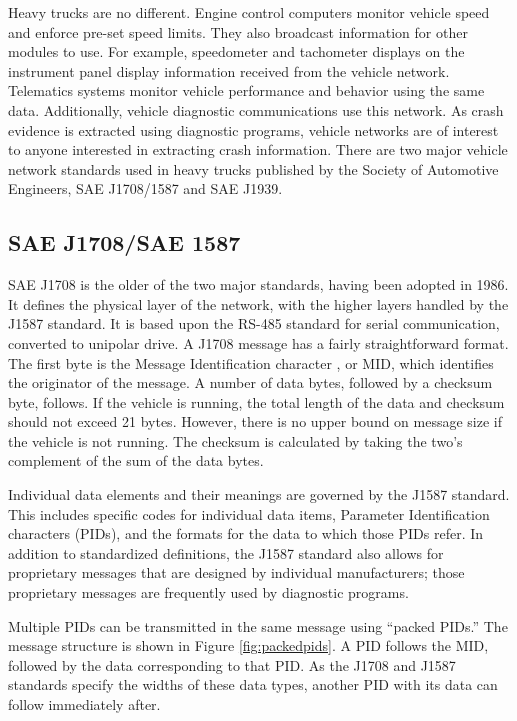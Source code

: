 Heavy trucks are no different. Engine control computers monitor vehicle speed and enforce pre-set speed limits. They also broadcast information
for other modules to use. For example, speedometer and tachometer displays on the instrument panel display information received from the vehicle
network. Telematics systems monitor vehicle performance and behavior using the same data. Additionally, vehicle diagnostic communications use
this network. As crash evidence is extracted using diagnostic programs, vehicle networks are of interest to anyone interested in extracting
crash information. There are two major vehicle network standards used in heavy trucks published by the Society of Automotive Engineers,
 SAE J1708/1587\cite{J1708}\cite{J1587} and SAE J1939\cite{J1939-71}.

\subsection{SAE J1708/SAE 1587}

SAE J1708 is the older of the two major standards, having been adopted in 1986. It defines the physical layer of the network,
with the higher layers handled by the J1587 standard. It is based upon the RS-485 standard for serial communication, converted to 
unipolar drive. A J1708 message has a fairly straightforward format. The first byte is the Message Identification character
, or MID, which identifies the originator of the message. A number of data bytes, followed by a checksum byte, follows. If the vehicle is running, 
the total length of the data and checksum should not exceed 21 bytes\cite{J1708}. However, there is no upper bound on message size if the vehicle 
is not running. The checksum is calculated by taking the two's complement of the sum of the data bytes.

Individual data elements and their meanings are governed by the J1587 standard\cite{J1587}. This includes specific codes for individual data items,
Parameter Identification characters (PIDs), and the formats for the data to which those PIDs refer. In addition to standardized definitions, 
the J1587 standard also allows for proprietary messages that are designed by individual manufacturers; those proprietary messages are frequently used by 
diagnostic programs.

Multiple PIDs can be transmitted in the same message using ``packed PIDs.'' The message structure is shown in Figure \ref{fig:packedpids}. A PID follows the MID, followed by
the data corresponding to that PID. As the J1708 and J1587 standards specify the widths of these data types, another PID with its data can follow immediately
after.

